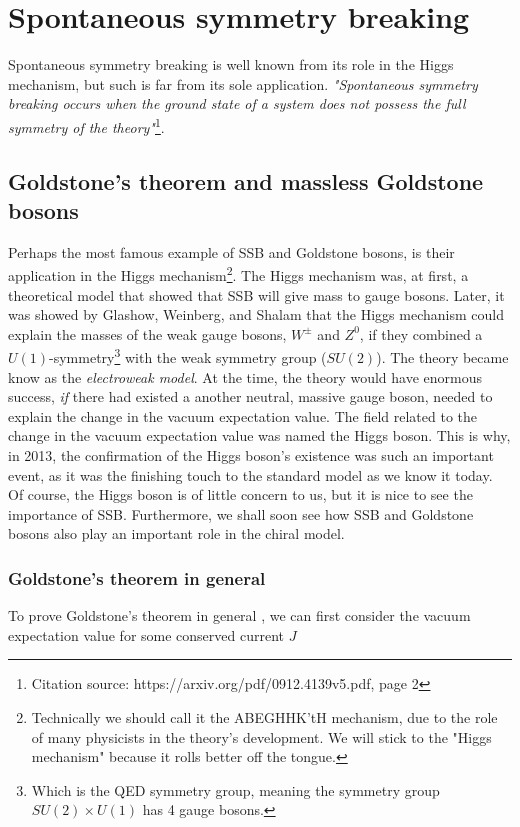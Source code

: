 \documentclass[10pt,twoside]{report}
\begin{document}
	\section{Spontaneous symmetry breaking}
	Spontaneous symmetry breaking is well known from its role in the Higgs mechanism, but such is far from its sole application. \emph{"Spontaneous symmetry breaking occurs when the ground state of a system does not possess the full symmetry of the theory"}\footnote{Citation source: https://arxiv.org/pdf/0912.4139v5.pdf, page 2}.
	
	
	\subsection{Goldstone's theorem and massless Goldstone bosons}
	Perhaps the most famous example of SSB and Goldstone bosons, is their application in the Higgs mechanism\footnote{Technically we should call it the ABEGHHK'tH mechanism, due to the role of many physicists in the theory's development. We will stick to the "Higgs mechanism" because it rolls better off the tongue.}. The Higgs mechanism was, at first, a theoretical model that showed that SSB will give mass to gauge bosons. Later, it was showed by Glashow, Weinberg, and Shalam that the Higgs mechanism could explain the masses of the weak gauge bosons, $W^\pm$ and $Z^0$, if they combined a $U(1)$-symmetry\footnote{Which is the QED symmetry group, meaning the symmetry group $SU(2)\times U(1)$ has 4 gauge bosons.} with the weak symmetry group ($SU(2)$). The theory became know as the \emph{electroweak model}. At the time, the theory would have enormous success, \emph{if} there had existed a another neutral, massive gauge boson, needed to explain the change in the vacuum expectation value. The field related to the change in the vacuum expectation value was named the Higgs boson. This is why, in 2013, the confirmation of the Higgs boson's existence was such an important event, as it was the finishing touch to the standard model as we know it today. Of course, the Higgs boson is of little concern to us, but it is nice to see the importance of SSB. Furthermore, we shall soon see how SSB and Goldstone bosons also play an important role in the chiral model.
	
	\subsubsection{Goldstone's theorem in general}
	To prove Goldstone's theorem in general \cite{EWeinberg11}, we can first consider the vacuum expectation value for some conserved current $J$
	
\end{document}
